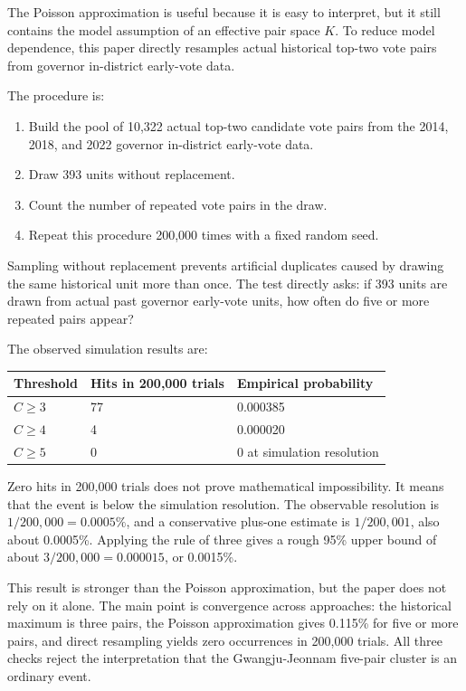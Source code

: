 \documentclass[preprint]{IEIE}
\begin{document}
The Poisson approximation is useful because it is easy to interpret, but it still contains the model assumption of an effective pair space \(K\). To reduce model dependence, this paper directly resamples actual historical top-two vote pairs from governor in-district early-vote data.

The procedure is:

\begin{enumerate}
\item Build the pool of 10,322 actual top-two candidate vote pairs from the 2014, 2018, and 2022 governor in-district early-vote data.
\item Draw 393 units without replacement.
\item Count the number of repeated vote pairs in the draw.
\item Repeat this procedure 200,000 times with a fixed random seed.
\end{enumerate}

Sampling without replacement prevents artificial duplicates caused by drawing the same historical unit more than once. The test directly asks: if 393 units are drawn from actual past governor early-vote units, how often do five or more repeated pairs appear?

The observed simulation results are:

\begin{center}
\small
\begin{tabular}{l l l}
\toprule
Threshold & Hits in 200,000 trials & Empirical probability \\
\midrule
\(C \geq 3\) & 77 & 0.000385 \\
\(C \geq 4\) & 4 & 0.000020 \\
\(C \geq 5\) & 0 & 0 at simulation resolution \\
\bottomrule
\end{tabular}
\end{center}

Zero hits in 200,000 trials does not prove mathematical impossibility. It means that the event is below the simulation resolution. The observable resolution is \(1/200,000=0.0005\%\), and a conservative plus-one estimate is \(1/200,001\), also about 0.0005\%. Applying the rule of three gives a rough 95\% upper bound of about \(3/200,000 = 0.000015\), or 0.0015\%.

This result is stronger than the Poisson approximation, but the paper does not rely on it alone. The main point is convergence across approaches: the historical maximum is three pairs, the Poisson approximation gives 0.115\% for five or more pairs, and direct resampling yields zero occurrences in 200,000 trials. All three checks reject the interpretation that the Gwangju-Jeonnam five-pair cluster is an ordinary event.
\end{document}
